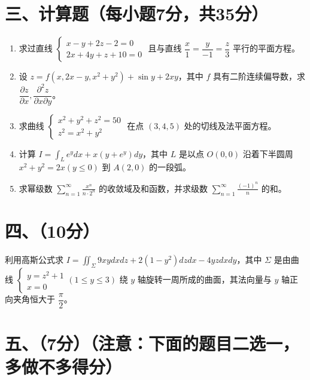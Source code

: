 \documentclass[12pt,a4paper]{article}
\begin{document}
\section*{三、计算题（每小题7分，共35分）}

\begin{enumerate}[label=\arabic*、, itemsep=2em]
    \item 求过直线 \(\begin{cases} x - y + 2z - 2 = 0 \\ 2x + 4y + z + 10 = 0 \end{cases}\) 且与直线 \(\dfrac{x}{1} = \dfrac{y}{-1} = \dfrac{z}{3}\) 平行的平面方程。

    \item 设 \(z = f(x, 2x-y, x^{2}+y^{2}) + \sin y + 2xy\)，其中 \(f\) 具有二阶连续偏导数，求 \(\dfrac{\partial z}{\partial x}, \dfrac{\partial^{2}z}{\partial x \partial y}\)。

    \item 求曲线 \(\begin{cases} x^{2} + y^{2} + z^{2} = 50 \\ z^{2} = x^{2} + y^{2} \end{cases}\) 在点 \((3,4,5)\) 处的切线及法平面方程。

    \item 计算 \(I = \displaystyle \int_{L}e^{y}dx + x(y+e^{y})dy\)，其中 \(L\) 是以点 \(O(0,0)\) 沿着下半圆周 \(x^{2} + y^{2} = 2x(y \leq 0)\) 到 \(A(2,0)\) 的一段弧。

    \item 求幂级数 \(\displaystyle \sum_{n=1}^{\infty}\frac{x^{n}}{n\cdot 2^{n}}\) 的收敛域及和函数，并求级数 \(\displaystyle \sum_{n=1}^{\infty}\frac{(-1)^{n}}{n}\) 的和。
\end{enumerate}

\section*{四、（10分）}

利用高斯公式求 \(I = \displaystyle \iint_{\Sigma}9xy dx dz + 2(1-y^{2})dz dx - 4yz dx dy\)，其中 \(\Sigma\) 是由曲线 \(\begin{cases} y = z^{2} + 1 \\ x = 0 \end{cases} (1 \leq y \leq 3)\) 绕 \(y\) 轴旋转一周所成的曲面，其法向量与 \(y\) 轴正向夹角恒大于 \(\dfrac{\pi}{2}\)。

\section*{五、（7分）（注意：下面的题目二选一，多做不多得分）}
\end{document}

